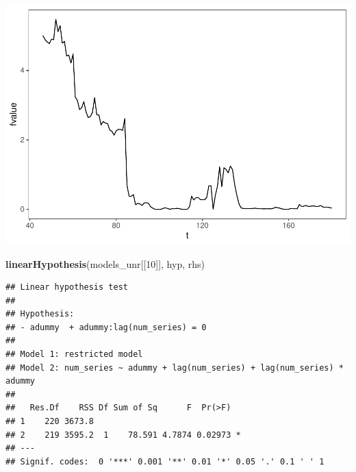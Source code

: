 \documentclass[11pt, a4paper]{report}
\newenvironment{Shaded}{\begin{snugshade}}{\end{snugshade}}
\newcommand{\DataTypeTok}[1]{\textcolor[rgb]{0.13,0.29,0.53}{#1}}
\newcommand{\DecValTok}[1]{\textcolor[rgb]{0.00,0.00,0.81}{#1}}
\newcommand{\KeywordTok}[1]{\textcolor[rgb]{0.13,0.29,0.53}{\textbf{#1}}}
\newcommand{\NormalTok}[1]{#1}
\newcommand{\OperatorTok}[1]{\textcolor[rgb]{0.81,0.36,0.00}{\textbf{#1}}}
\newcommand{\StringTok}[1]{\textcolor[rgb]{0.31,0.60,0.02}{#1}}
\theoremstyle{plain}
\theoremstyle{plain}
\theoremstyle{remark}
\begin{document}
\begin{Shaded}
\end{Shaded}

\begin{center}\includegraphics{Econo2_P7_files/figure-latex/all-5} \end{center}

\begin{Shaded}
\begin{Highlighting}[]
\KeywordTok{linearHypothesis}\NormalTok{(models_unr[[}\DecValTok{10}\NormalTok{]], hyp, rhs)}
\end{Highlighting}
\end{Shaded}

\begin{verbatim}
## Linear hypothesis test
## 
## Hypothesis:
## - adummy  + adummy:lag(num_series) = 0
## 
## Model 1: restricted model
## Model 2: num_series ~ adummy + lag(num_series) + lag(num_series) * adummy
## 
##   Res.Df    RSS Df Sum of Sq      F  Pr(>F)  
## 1    220 3673.8                              
## 2    219 3595.2  1    78.591 4.7874 0.02973 *
## ---
## Signif. codes:  0 '***' 0.001 '**' 0.01 '*' 0.05 '.' 0.1 ' ' 1
\end{verbatim}
\end{document}
